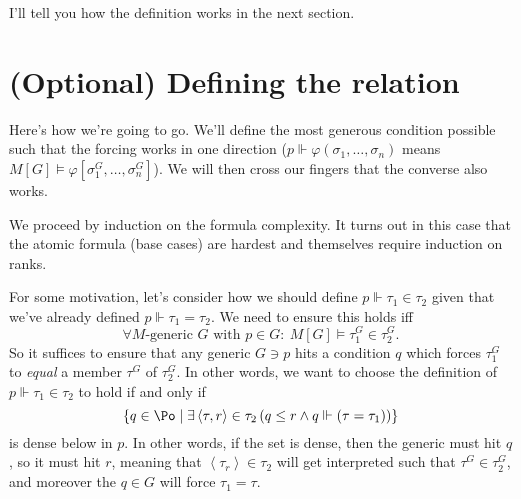 I'll tell you how the definition works in the next section.

\section{(Optional) Defining the relation}
Here's how we're going to go.
We'll define the most generous condition possible such that
the forcing works in one direction ($p \Vdash \varphi(\sigma_1, \dots, \sigma_n)$ means
$M[G] \vDash \varphi[\sigma_1^G, \dots, \sigma_n^G]$).
We will then cross our fingers that the converse also works.

We proceed by induction on the formula complexity.
It turns out in this case that the atomic formula (base cases)
are hardest and themselves require induction on ranks.

For some motivation, let's consider how we should define
$p \Vdash \tau_1 \in \tau_2$ given that we've
already defined $p \Vdash \tau_1 = \tau_2$.
We need to ensure this holds iff
\[ \forall \text{$M$-generic $G$ with $p \in G$}:
	\ M[G] \vDash \tau_1^G \in \tau_2^G. \]
So it suffices to ensure that any generic $G \ni p$ hits a condition $q$ which forces $\tau_1^G$ to \emph{equal} a member $\tau^G$ of $\tau_2^G$.
In other words, we want to choose the definition of $p \Vdash \tau_1 \in \tau_2$ to hold if and only if
\[
	\left\{ q \in \Po
		\mid \exists \left<\tau, r\right> \in \tau_2
		\left( q \le r \land q \Vdash(\tau=\tau_1) \right) \right\}
\]
is dense below in $p$.
In other words, if the set is dense, then the generic must hit $q$, so it must hit $r$, meaning that $\left<\tau_r\right> \in \tau_2$ will get interpreted such that $\tau^G \in \tau_2^G$, and moreover the $q \in G$ will force $\tau_1 = \tau$.

